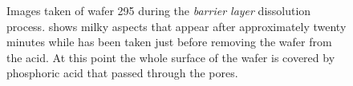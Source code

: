 \documentclass[../thesis.tex]{subfiles}
\begin{document}
        \begin{figure}[htpb]
          \centering
          \hfill
          \caption{Images taken of wafer 295 during the \textit{barrier layer} dissolution process. \protect{} shows milky aspects that appear after approximately twenty minutes while \protect{} has been taken just before removing the wafer from the acid. At this point the whole surface of the wafer is covered by phosphoric acid that passed through the pores.}
          \label{fig:barrier-layer-diss-images}
        \end{figure}
\end{document}
